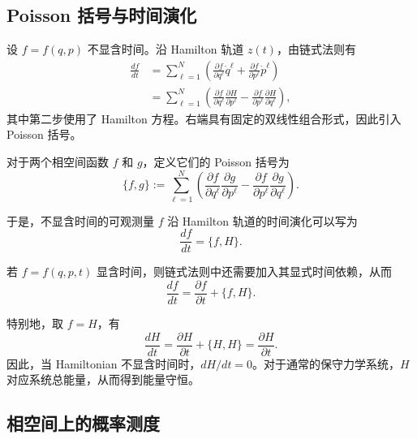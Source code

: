 \documentclass[UTF8,a4paper,11pt,openany]{ctexbook}
\begin{document}
\subsection{Poisson 括号与时间演化}

设 $f=f(q,p)$ 不显含时间。沿 Hamilton 轨道 $z(t)$，由链式法则有
\begin{align}
    \frac{df}{dt}
    &=
    \sum_{\ell=1}^{N}
    \left(
        \frac{\partial f}{\partial q^\ell}\dot q^\ell
        +
        \frac{\partial f}{\partial p^\ell}\dot p^\ell
    \right)
    \nonumber\\
    &=
    \sum_{\ell=1}^{N}
    \left(
        \frac{\partial f}{\partial q^\ell}
        \frac{\partial H}{\partial p^\ell}
        -
        \frac{\partial f}{\partial p^\ell}
        \frac{\partial H}{\partial q^\ell}
    \right),
\end{align}
其中第二步使用了 Hamilton 方程。右端具有固定的双线性组合形式，因此引入 Poisson 括号。

\begin{definition}[Poisson 括号]
对于两个相空间函数 $f$ 和 $g$，定义它们的 Poisson 括号为
\begin{equation}
    \{f,g\}
    :=
    \sum_{\ell=1}^{N}
    \left(
        \frac{\partial f}{\partial q^\ell}
        \frac{\partial g}{\partial p^\ell}
        -
        \frac{\partial f}{\partial p^\ell}
        \frac{\partial g}{\partial q^\ell}
    \right).
\end{equation}
\end{definition}

于是，不显含时间的可观测量 $f$ 沿 Hamilton 轨道的时间演化可以写为
\begin{equation}
    \frac{df}{dt}
    =
    \{f,H\}.
\end{equation}

若 $f=f(q,p,t)$ 显含时间，则链式法则中还需要加入其显式时间依赖，从而
\begin{equation}
    \frac{df}{dt}
    =
    \frac{\partial f}{\partial t}
    +
    \{f,H\}.
\end{equation}

特别地，取 $f=H$，有
\[
\frac{dH}{dt}
=
\frac{\partial H}{\partial t}
+
\{H,H\}
=
\frac{\partial H}{\partial t}.
\]
因此，当 Hamiltonian 不显含时间时，$dH/dt=0$。对于通常的保守力学系统，$H$ 对应系统总能量，从而得到能量守恒。

\subsection{相空间上的概率测度}
\end{document}
